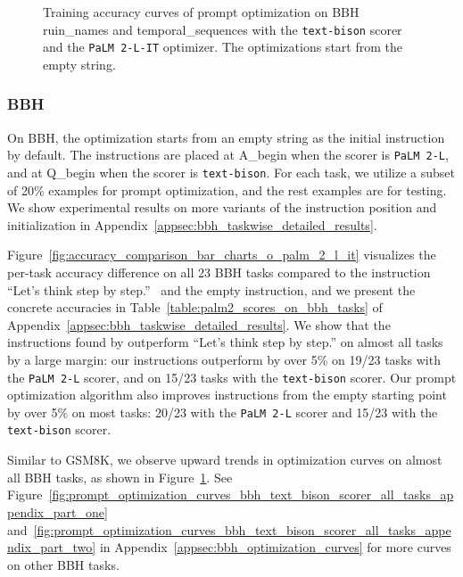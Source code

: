 \begin{figure}[t]
\centering
{}
\hspace{.01\linewidth}

\caption{Training accuracy curves of prompt optimization on BBH ruin\_names and temporal\_sequences with the \texttt{text-bison} scorer and the \texttt{PaLM 2-L-IT} optimizer.
The optimizations start from the empty string.
}
\label{fig:prompt_optimization_in_main_results_bbh}
\end{figure}

\subsubsection{BBH}
On BBH, the optimization starts from an empty string as the initial instruction by default. The instructions are placed at A\_begin when the scorer is \texttt{PaLM 2-L}, and at Q\_begin when the scorer is \texttt{text-bison}. For each task, we utilize a subset of 20\% examples for prompt optimization, and the rest examples are for testing. We show experimental results on more variants of the instruction position and initialization in Appendix~\ref{appsec:bbh_taskwise_detailed_results}.

Figure~\ref{fig:accuracy_comparison_bar_charts_o_palm_2_l_it} visualizes the per-task accuracy difference on all 23 BBH tasks compared to the instruction ``Let's think step by step.''~\citep{kojima2022large} and the empty instruction, and we present the concrete accuracies in Table~\ref{table:palm2_scores_on_bbh_tasks} of Appendix~\ref{appsec:bbh_taskwise_detailed_results}. We show that the instructions found by \name{} outperform ``Let's think step by step.'' on almost all tasks by a large margin: our instructions outperform by over 5\% on 19/23 tasks with the \texttt{PaLM 2-L} scorer, and on 15/23 tasks with the \texttt{text-bison} scorer.
Our prompt optimization algorithm also improves instructions from the empty starting point by over 5\% on most tasks: 20/23 with the \texttt{PaLM 2-L} scorer and 15/23 with the \texttt{text-bison} scorer.

Similar to GSM8K, we observe upward trends in optimization curves on almost all BBH tasks, as shown in Figure~\ref{fig:prompt_optimization_in_main_results_bbh}.
See Figure~\ref{fig:prompt_optimization_curves_bbh_text_bison_scorer_all_tasks_appendix_part_one} and~\ref{fig:prompt_optimization_curves_bbh_text_bison_scorer_all_tasks_appendix_part_two} in Appendix~\ref{appsec:bbh_optimization_curves} for more curves on other BBH tasks. 

